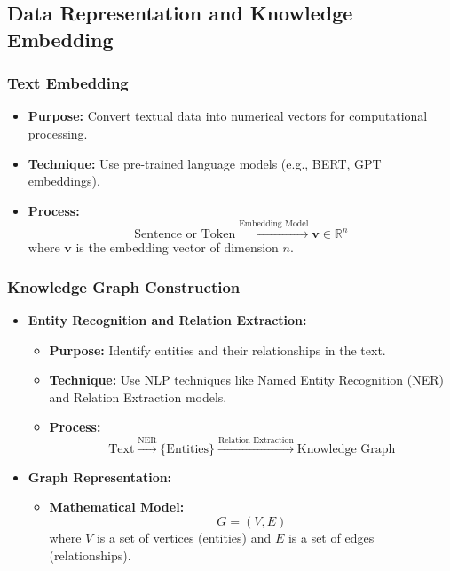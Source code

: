 \documentclass[12pt]{article}
\begin{document}
\subsection{Data Representation and Knowledge Embedding}

\subsubsection{Text Embedding}

\begin{itemize}
    \item \textbf{Purpose:} Convert textual data into numerical vectors for computational processing.
    \item \textbf{Technique:} Use pre-trained language models (e.g., BERT, GPT embeddings).
    \item \textbf{Process:}
    \[
    \text{Sentence or Token} \xrightarrow{\text{Embedding Model}} \mathbf{v} \in \mathbb{R}^n
    \]
    where \( \mathbf{v} \) is the embedding vector of dimension \( n \).
\end{itemize}

\subsubsection{Knowledge Graph Construction}

\begin{itemize}
    \item \textbf{Entity Recognition and Relation Extraction:}
    \begin{itemize}
        \item \textbf{Purpose:} Identify entities and their relationships in the text.
        \item \textbf{Technique:} Use NLP techniques like Named Entity Recognition (NER) and Relation Extraction models.
        \item \textbf{Process:}
        \[
        \text{Text} \xrightarrow{\text{NER}} \{\text{Entities}\} \xrightarrow{\text{Relation Extraction}} \text{Knowledge Graph}
        \]
    \end{itemize}
    \item \textbf{Graph Representation:}
    \begin{itemize}
        \item \textbf{Mathematical Model:}
        \[
        G = (V, E)
        \]
        where \( V \) is a set of vertices (entities) and \( E \) is a set of edges (relationships).
    \end{itemize}
\end{itemize}
\end{document}
